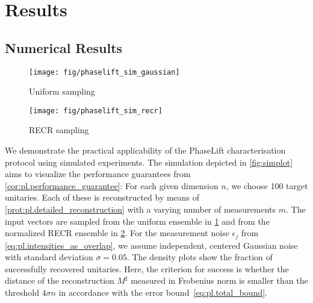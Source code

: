 \section{Results}%
\label{sec:pl.results}

\subsection{Numerical Results}
\label{sub:pl.results.numerics}


\begin{figure*}[tbp]
  \begin{subfigure}{.475\columnwidth}
    \texttt{[image: fig/phaselift\_sim\_gaussian]}
    \caption{\label{sfig:simplot.gaussian}%
      Uniform sampling
    }
   \end{subfigure}
  \begin{subfigure}{.475\columnwidth}
    \texttt{[image: fig/phaselift\_sim\_recr]}
    \caption{\label{sfig:simplot.recr}%
      RECR sampling
    }
   \end{subfigure}
  \caption{\label{fig:simplot}%
    Simulated recovery-probability using the two different sampling schemes under noisy measurements with $\sigma = 0.05$.
    For each given dimension, the transfer matrices to be recovered consist of 97 Haar random unitaries as well as the identity, the swap-matrix, and the discrete Fourier transform.
    The red line indicates the conjectured phase transition at $4 n - 4$.
  }
\end{figure*}

We demonstrate the practical applicability of the PhaseLift characterisation protocol using simulated experiments.
The simulation depicted in \cref{fig:simplot} aims to visualize the performance guarantees from \cref{cor:pl.performance_guarantee}:
For each given dimension $n$, we choose 100 target unitaries.
Each of these is reconstructed by means of \cref{prot:pl.detailed_reconstruction} with a varying number of measurements $m$.
The input vectors are sampled from the uniform ensemble in \cref{sfig:simplot.gaussian} and from the normalized RECR ensemble in \cref{sfig:simplot.recr}.
For the measurement noise $\epsilon_j$ from \cref{eq:pl.intensities_as_overlap}, we assume independent, centered Gaussian noise with standard deviation $\sigma = 0.05$.
The density plots show the fraction of successfully recovered unitaries.
Here, the criterion for success is whether the distance of the reconstruction $M^\sharp$ measured in Frobenius norm is smaller than the threshold  $4 \sigma n$ in accordance with the error bound~\eqref{eq:pl.total_bound}.

